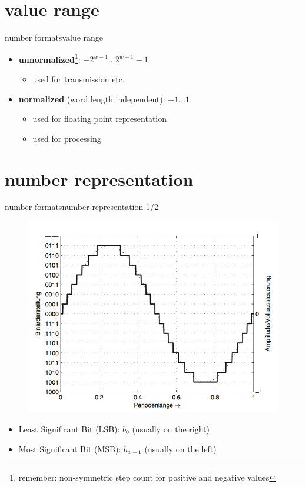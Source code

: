 \section[range]{value range}
	\begin{frame}{number formats}{value range}
		
            
			\begin{itemize}
				\item	\textbf{unnormalized}\footnote{remember: non-symmetric step count for positive and negative values}: $-2^{w-1}\ldots 2^{w-1}-1$
                    \begin{itemize}
                        \item   used for transmission etc.
                    \end{itemize}
				\bigskip
                \item	\textbf{normalized} (word length independent): $-1\ldots 1$
                    \begin{itemize}
                        \item   used for floating point representation
                        \item   used for processing
                    \end{itemize}
			\end{itemize}
            
            
	\end{frame}	

\section[number representation]{number representation}
	\begin{frame}{number formats}{number representation 1/2}
	    \begin{figure}
			\centering
				\includegraphics[scale=0.6]{Graph/2complement}
		\end{figure}
		\begin{itemize}
			\item	Least Significant Bit (LSB): $b_0$ (usually on the right)
			\item	Most Significant Bit (MSB): $b_{w-1}$ (usually on the left)
		\end{itemize}
	\end{frame}	


